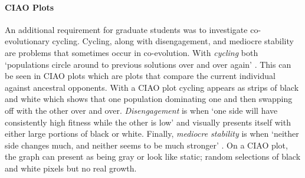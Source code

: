 \paragraph{CIAO Plots}

An additional requirement for graduate students was to investigate co-evolutionary cycling. 
Cycling, along with disengagement, and mediocre stability are problems that sometimes occur in co-evolution.
With \textit{cycling} both `populations circle around to previous solutions over and over again' \cite{rush_tauritz}. 
This can be seen in CIAO plots which are plots that compare the current individual against ancestral opponents.
With a CIAO plot cycling appears as strips of black and white which shows that one population dominating one and then swapping off with the other over and over.
\textit{Disengagement} is when `one side will have consistently high fitness while the other is low' \cite{rush_tauritz} and visually presents itself with either large portions of black or white. 
Finally, \textit{mediocre stability} is when `neither side changes much, and neither seems to be much stronger' \cite{rush_tauritz}.
On a CIAO plot, the graph can present as being gray or look like static; random selections of black and white pixels but no real growth.